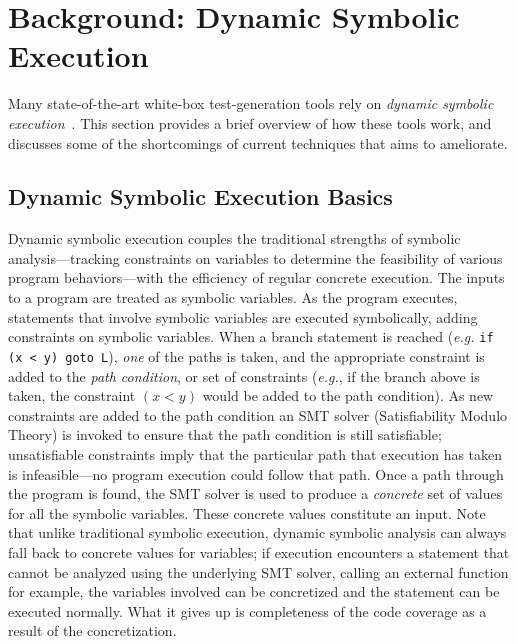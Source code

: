\section{Background: Dynamic Symbolic Execution}
\label{sec:background}

Many state-of-the-art white-box test-generation tools rely on {\em dynamic
symbolic execution}~\cite{klee,dart-pldi05,sen-cacm}. This section provides a brief
overview of how these tools work, and discusses some of the shortcomings of
current techniques that \lancet aims to ameliorate.

\subsection{Dynamic Symbolic Execution Basics}

Dynamic symbolic execution couples the traditional strengths of symbolic
analysis---tracking constraints on variables to determine the feasibility of
various program behaviors---with the efficiency of regular concrete execution.
The inputs to a program are treated as symbolic variables.
As the program
executes, statements that involve symbolic variables are executed
symbolically, adding constraints on symbolic variables. When a
branch statement is reached ({\em e.g.} {\tt if (x < y) goto L}), {\em one} of
the paths is taken, and the appropriate constraint is added to the {\em path condition}, or set of constraints ({\em e.g.}, if the branch above is taken, the constraint $(x <
y)$ would be added to the path condition). As new constraints are added to the
path condition an SMT solver (Satisfiability Modulo Theory) is invoked to ensure that
the path condition is still satisfiable; unsatisfiable constraints imply that
the particular path that execution has taken is infeasible---no program
execution could follow that path. Once a path through the program is found,
the SMT solver is used to produce a {\em concrete} set of values for all
the symbolic variables. These concrete values constitute an input. Note that
unlike traditional symbolic execution, dynamic symbolic analysis can always
fall back to concrete values for variables; if execution encounters a
statement that cannot be analyzed using the underlying SMT solver, calling an external function for example, the
variables involved can be concretized and the statement can be executed
normally. What it gives up is completeness of the code coverage as a result
of the concretization. 

